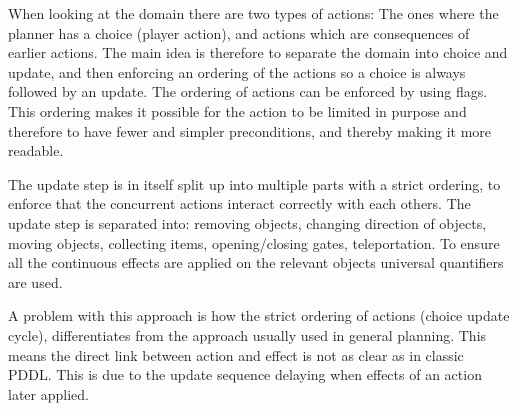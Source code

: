 		When looking at the domain there are two types of actions: The ones where the planner has a choice (player action), and actions which are consequences of earlier actions. The main idea is therefore to separate the domain into choice and update, and then enforcing an ordering of the actions so a choice is always followed by an update. The ordering of actions can be enforced by using flags. This ordering makes it possible for the action to be limited in purpose and therefore to have fewer and simpler preconditions, and thereby making it more readable.
		
		The update step is in itself split up into multiple parts with a strict ordering, to enforce that the concurrent actions interact correctly with each others. The update step is separated into: removing objects, changing direction of objects, moving objects, collecting items, opening/closing gates, teleportation. To ensure all the continuous effects are applied on the relevant objects universal quantifiers are used. 
		
		A problem with this approach is how the strict ordering of actions (choice update cycle), differentiates from the approach usually used in general planning. This means the direct link between action and effect is not as clear as in classic PDDL. This is due to the update sequence delaying when effects of an action later applied. 
		
	

	
	


